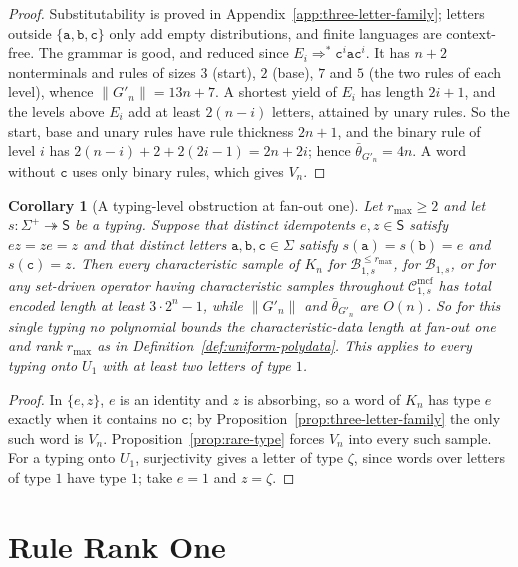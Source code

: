 \documentclass[11pt]{article}
\numberwithin{equation}{section}
\theoremstyle{plain}
\newtheorem{corollary}[theorem]{Corollary}
\theoremstyle{definition}
\theoremstyle{remark}
\newcommand{\Cmcf}[2]{\mathcal{C}^{\mathrm{mcf}}_{#1,#2}}
\begin{document}
\begin{proof}
Substitutability is proved in Appendix~\ref{app:three-letter-family}; letters
outside $\{\mathtt a,\mathtt b,\mathtt c\}$ only add empty distributions, and
finite languages are context-free.  The grammar is good, and reduced since
$E_i\Rightarrow^*\mathtt c^i\mathtt a\mathtt c^i$.  It has $n+2$ nonterminals
and rules of sizes $3$ (start), $2$ (base), $7$ and $5$ (the two rules of each
level), whence $\|G'_n\|=13n+7$.  A shortest yield of $E_i$ has length $2i+1$,
and the levels above $E_i$ add at least $2(n-i)$ letters, attained by unary
rules.  So the start, base and unary rules have rule thickness $2n+1$, and the
binary rule of level $i$ has $2(n-i)+2+2(2i-1)=2n+2i$; hence
$\bar\theta_{G'_n}=4n$.  A word without $\mathtt c$ uses only binary rules,
which gives $V_n$.
\end{proof}

\begin{corollary}[A typing-level obstruction at fan-out one]
\label{cor:typing-level-obstruction}
Let $r_{\max}\ge2$ and let $s:\Sigma^+\twoheadrightarrow\mathsf S$ be a typing.
Suppose that distinct idempotents $e,z\in\mathsf S$ satisfy $ez=ze=z$ and that
distinct letters $\mathtt a,\mathtt b,\mathtt c\in\Sigma$ satisfy
$s(\mathtt a)=s(\mathtt b)=e$ and $s(\mathtt c)=z$.  Then every characteristic
sample of $K_n$ for $\mathcal B^{\le r_{\max}}_{1,s}$, for $\mathcal B_{1,s}$, or for
any set-driven operator having characteristic samples throughout $\Cmcf{1}{s}$
has total encoded length at least $3\cdot2^n-1$, while $\|G'_n\|$ and
$\bar\theta_{G'_n}$ are $O(n)$.  So for this single typing no polynomial
bounds the characteristic-data length at fan-out one and rank $r_{\max}$ as in
Definition~\ref{def:uniform-polydata}.  This applies to every typing onto $U_1$
with at least two letters of type $1$.
\end{corollary}

\begin{proof}
In $\{e,z\}$, $e$ is an identity and $z$ is absorbing, so a word of $K_n$ has type
$e$ exactly when it contains no $\mathtt c$; by
Proposition~\ref{prop:three-letter-family} the only such word is $V_n$.
Proposition~\ref{prop:rare-type} forces $V_n$ into every such sample.  For a
typing onto $U_1$, surjectivity gives a letter of type $\zeta$, since words over
letters of type $1$ have type $1$; take $e=1$ and $z=\zeta$.
\end{proof}

\section{Rule Rank One}
\label{sec:further}
\label{subsec:rank-one}
\end{document}
